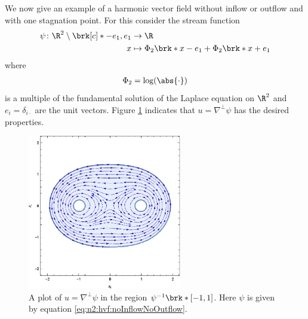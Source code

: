 We now give an example of a harmonic vector field without 
inflow or outflow and with one stagnation point.
For this consider the stream function
\begin{equation}
  \begin{aligned}
  \psi\colon\R^2\setminus\brk[c]*{-e_1,e_1}&\to\R \\
  x&\mapsto\Phi_2\brk*{x-e_1}+\Phi_2\brk*{x+e_1}
  \end{aligned}\label{eq:n2:hvf:noInflowNoOutflow}
\end{equation}
where
\begin{align*}
  \Phi_2=\log(\abs{\cdot})
\end{align*}
is a multiple of the fundamental solution of the Laplace equation on $\R^2$ and $e_i=\delta_{i\cdot}$ are the unit vectors.
Figure \ref{pl:n2_hvf_noInflowNoOutflow} indicates that $u=\nabla^\perp\psi$ has the desired properties.
\begin{figure}
  \centering
  \includegraphics[width=0.6\textwidth]{../Plots/HarmonicVectorFields_gr1.eps}
  \caption{A plot of $u=\nabla^\perp\psi$ in the region $\psi^{-1}\brk*{[-1,1]}$.
    Here $\psi$ is given by equation \eqref{eq:n2:hvf:noInflowNoOutflow}.}
  \label{pl:n2_hvf_noInflowNoOutflow}
\end{figure}

